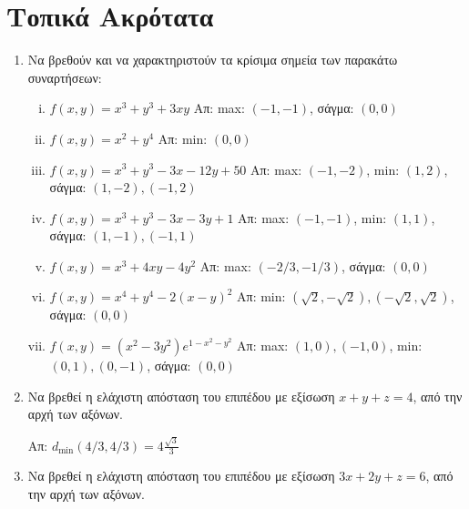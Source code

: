 


\pagestyle{askhseis}
\geometry{top=2cm}

\renewcommand{\vec}{\mathbf}



\begin{center}
  \minibox{\large \bfseries \textcolor{Col1}{Ασκήσεις στα Ακρότατα}}
\end{center}


\section*{Τοπικά Ακρότατα}

\begin{enumerate}
  \item Να βρεθούν και να χαρακτηριστούν τα κρίσιμα σημεία  των παρακάτω συναρτήσεων:
    \begin{enumerate}[i)]
      \item $ f(x,y) = x^{3} + y^{3} + 3xy $ 
        \hfill Απ: max: $(-1,-1)  $, σάγμα: $ (0,0) $
      \item $ f(x,y) = x^{2}+y^{4} $ 
        \hfill Απ: min: $ (0,0) $ 
      \item $ f(x,y) = x^{3} + y^{3} - 3x -12y + 50 $ 
        \hfill Απ: max: $ (-1,-2)$, min: $ (1,2) $, 
        σάγμα: $ (1,-2), (-1,2) $
      \item $ f(x,y) = x^{3} + y^{3} -3x -3y + 1 $ 
        \hfill Απ: max: $(-1,-1)  $, min: $ (1,1) $,
        σάγμα: $ (1,-1), (-1,1) $
      \item $ f(x,y) = x^{3} + 4xy -4y^{2} $ 
        \hfill Απ: max: $ (-2/3, -1/3)  $, σάγμα: $ (0,0) $
      \item $ f(x,y) = x^{4} + y^{4} -2(x-y)^{2}$  
        \hfill Απ: min: $ (\sqrt{2} , -\sqrt{2}), (-\sqrt{2} , \sqrt{2}) $, 
        σάγμα: $ (0,0) $
      \item $ f(x,y) = (x^{2}-3y^{2})e^{1-x^{2}-y^{2}} $ 
        \hfill Απ: max: $ (1,0), (-1,0) $, min: $ (0,1), (0,-1) $, 
        σάγμα: $ (0,0) $
    \end{enumerate}

  \item Να βρεθεί η ελάχιστη απόσταση του επιπέδου με εξίσωση $ x+y+z=4 $, από την 
    αρχή των αξόνων.

    \hfill Απ: $ d_{\min}(4/3,4/3) = 4\frac{\sqrt{3}}{3} $  

  \item Να βρεθεί η ελάχιστη απόσταση του επιπέδου με εξίσωση $ 3x+2y+z=6 $, από την 
    αρχή των αξόνων.


\end{enumerate}
